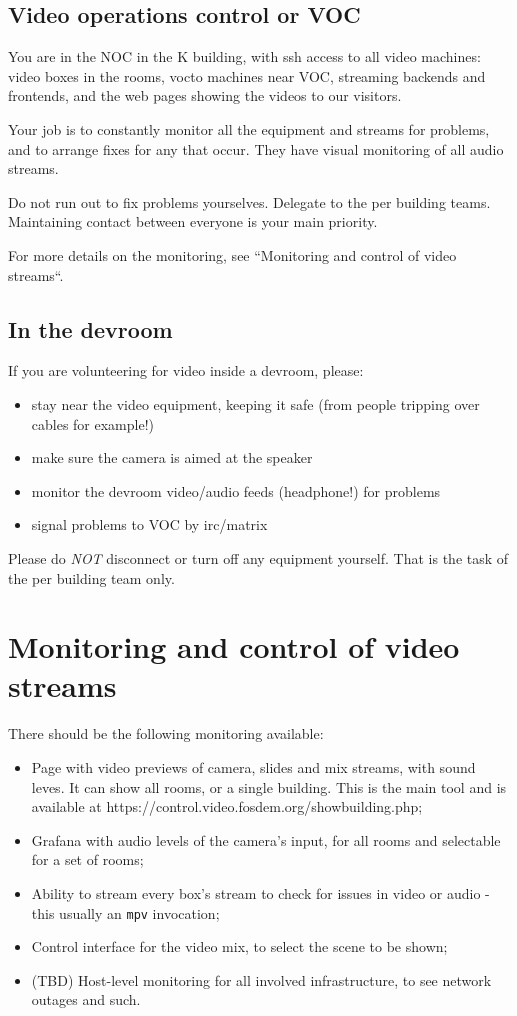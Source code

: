 \documentclass{article}
\begin{document}
\subsection{Video operations control or VOC}
You are in the NOC in the K building, with ssh access to all video machines: video boxes in the rooms, vocto machines near VOC, streaming backends and frontends, and the web pages showing the videos to our visitors.

Your job is to constantly monitor all the equipment and streams for problems, and to arrange fixes for any that occur. They have visual monitoring of all audio streams.

Do not run out to fix problems yourselves. Delegate to the per building teams. Maintaining contact between everyone is your main priority.

For more details on the monitoring, see ``Monitoring and control of video streams``. 


\subsection{In the devroom}
If you are volunteering for video inside a devroom, please:
\begin{itemize}
  \item stay near the video equipment, keeping it safe (from people tripping over cables for example!)
  \item make sure the camera is aimed at the speaker
  \item monitor the devroom video/audio feeds (headphone!) for problems
  \item signal problems to VOC by irc/matrix
\end{itemize}

Please do \emph{NOT} disconnect or turn off any equipment yourself. That is the task of the per building team only.

\section{Monitoring and control of video streams}

There should be the following monitoring available:

\begin{itemize}
  \item Page with video previews of camera, slides and mix streams, with sound leves. It can show all rooms, or a single building. This is the main tool and is available at https://control.video.fosdem.org/showbuilding.php;
  \item Grafana with audio levels of the camera's input, for all rooms and selectable for a set of rooms;
  \item Ability to stream every box's stream to check for issues in video or audio - this usually an \texttt{mpv} invocation;
  \item Control interface for the video mix, to select the scene to be shown;
  \item (TBD) Host-level monitoring for all involved infrastructure, to see network outages and such.
\end{itemize}
\end{document}
